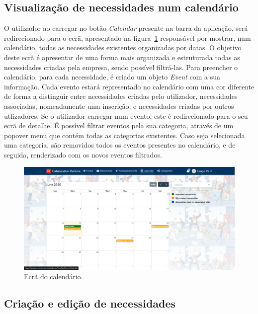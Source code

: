 \subsection{Visualização de necessidades num calendário}\label{subsec:implementacao:calendarNecessitiesView}

O utilizador ao carregar no botão \textit{Calendar} presente na barra da aplicação, será redirecionado para o ecrã, apresentado na figura~\ref{fig:CalendarScreen} responsável por mostrar, num calendário, todas as necessidades existentes organizadas por datas. 
O objetivo deste ecrã é apresentar de uma forma mais organizada e estruturada todas as necessidades criadas pela empresa, sendo possível filtrá-las. 
Para preencher o calendário, para cada necessidade, é criado um objeto \textit{Event} com a sua informação. 
Cada evento estará representado no calendário com uma cor diferente de forma a distinguir entre necessidades criadas pelo utilizador, necessidades associadas, nomeadamente uma inscrição, e necessidades criadas por outros utlizadores.
Se o utilizador carregar num evento, este é redirecionado para o seu ecrã de detalhe. 
É possível filtrar eventos pela sua categoria, através de um popover menu que contém todas as categorias existentes. 
Caso seja selecionada uma categoria, são removidos todos os eventos presentes no calendário, e de seguida, renderizado com os novos eventos filtrados.

\begin{figure}[H]
  \centering 
  \includegraphics[scale=0.4]{figures/Calendar.png}
  \caption{Ecrã do calendário.}\label{fig:CalendarScreen}
\end{figure}

\subsection{Criação e edição de necessidades}\label{subsec:implementacao:necessityCreation}

